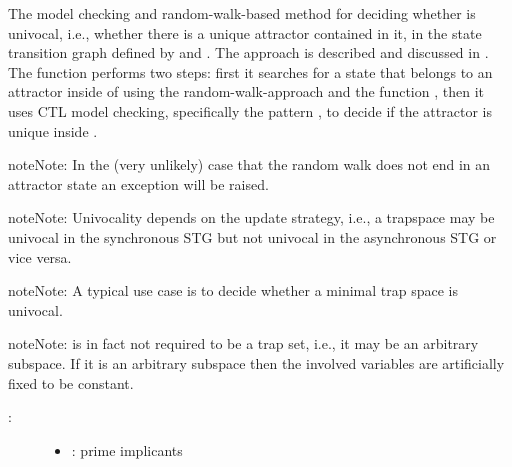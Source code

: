 \documentclass[letterpaper,10pt,english]{sphinxmanual}
\begin{document}
\begin{fulllineitems}
\label{\detokenize{Attractors:PyBoolNet.Attractors.univocality}}
The model checking and random-walk-based method for deciding whether  is univocal,
i.e., whether there is a unique attractor contained in it,
in the state transition graph defined by  and .
The approach is described and discussed in {\hyperref[\detokenize{Bibliography:klarner2015trap}]{}}.
The function performs two steps: first it searches for a state that belongs to an attractor inside of  using
the random-walk-approach and the function {\hyperref[\detokenize{StateTransitionGraphs:random-walk}]{}},
then it uses CTL model checking, specifically the pattern ,
to decide if the attractor is unique inside .

\begin{sphinxadmonition}{note}{Note:}
In the (very unlikely) case that the random walk does not end in an attractor state an exception will be raised.
\end{sphinxadmonition}

\begin{sphinxadmonition}{note}{Note:}
Univocality depends on the update strategy, i.e.,
a trapspace may be univocal in the synchronous STG but not univocal in the asynchronous STG or vice versa.
\end{sphinxadmonition}

\begin{sphinxadmonition}{note}{Note:}
A typical use case is to decide whether a minimal trap space is univocal.
\end{sphinxadmonition}

\begin{sphinxadmonition}{note}{Note:}
 is in fact not required to be a trap set, i.e., it may be an arbitrary subspace.
If it is an arbitrary subspace then the involved variables are artificially fixed to be constant.
\end{sphinxadmonition}
\begin{description}
\item[{:}] \leavevmode\begin{itemize}
\item {} 
: prime implicants


\end{itemize}
\end{description}
\end{fulllineitems}
\end{document}
